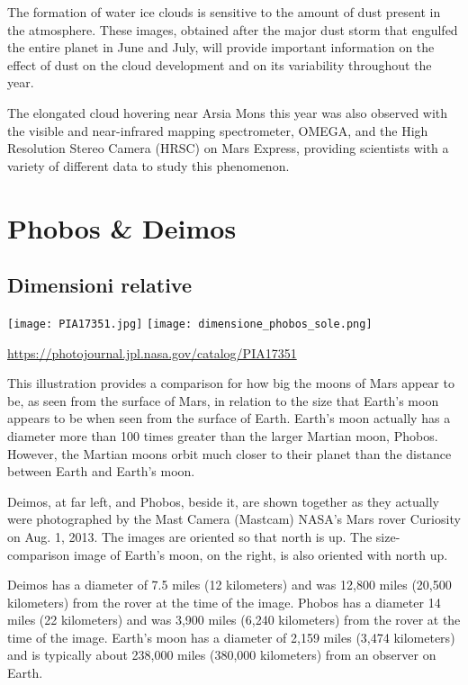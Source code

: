 \documentclass[a4paper,10pt,openany,oneside]{memoir}
\begin{document}
The formation of water ice clouds is sensitive to the amount of dust present in the atmosphere. These images, obtained after the major dust storm that engulfed the entire planet in June and July, will provide important information on the effect of dust on the cloud development and on its variability throughout the year.

The elongated cloud hovering near Arsia Mons this year was also observed with the visible and near-infrared mapping spectrometer, OMEGA, and the High Resolution Stereo Camera (HRSC) on Mars Express, providing scientists with a variety of different data to study this phenomenon.



\chapter{Phobos \& Deimos}

\section{Dimensioni relative}

\texttt{[image: PIA17351.jpg]}
\texttt{[image: dimensione\_phobos\_sole.png]}

\url{https://photojournal.jpl.nasa.gov/catalog/PIA17351}

This illustration provides a comparison for how big the moons of Mars appear to be, as seen from the surface of Mars, in relation to the size that Earth's moon appears to be when seen from the surface of Earth. Earth's moon actually has a diameter more than 100 times greater than the larger Martian moon, Phobos. However, the Martian moons orbit much closer to their planet than the distance between Earth and Earth's moon.

Deimos, at far left, and Phobos, beside it, are shown together as they actually were photographed by the Mast Camera (Mastcam) NASA's Mars rover Curiosity on Aug. 1, 2013. The images are oriented so that north is up. The size-comparison image of Earth's moon, on the right, is also oriented with north up.

Deimos has a diameter of 7.5 miles (12 kilometers) and was 12,800 miles (20,500 kilometers) from the rover at the time of the image. Phobos has a diameter 14 miles (22 kilometers) and was 3,900 miles (6,240 kilometers) from the rover at the time of the image. Earth's moon has a diameter of 2,159 miles (3,474 kilometers) and is typically about 238,000 miles (380,000 kilometers) from an observer on Earth. 
\end{document}
